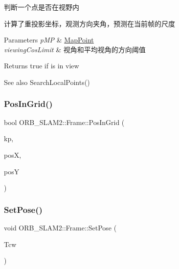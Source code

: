 判断一个点是否在视野内 

计算了重投影坐标，观测方向夹角，预测在当前帧的尺度 
\begin{DoxyParams}{Parameters}
{\em p\+MP} & \mbox{\hyperlink{class_o_r_b___s_l_a_m2_1_1_map_point}{Map\+Point}} \\
\hline
{\em viewing\+Cos\+Limit} & 视角和平均视角的方向阈值 \\
\hline
\end{DoxyParams}
\begin{DoxyReturn}{Returns}
true if is in view 
\end{DoxyReturn}
\begin{DoxySeeAlso}{See also}
Search\+Local\+Points() 
\end{DoxySeeAlso}
\mbox{\label{class_o_r_b___s_l_a_m2_1_1_frame_ae2bc4b1482d2010511da5423d298c9bd}} 
\subsubsection{\texorpdfstring{Pos\+In\+Grid()}{PosInGrid()}}
{\footnotesize\ttfamily bool O\+R\+B\+\_\+\+S\+L\+A\+M2\+::\+Frame\+::\+Pos\+In\+Grid (\begin{DoxyParamCaption}\item[{const cv\+::\+Key\+Point \&}]{kp,  }\item[{int \&}]{posX,  }\item[{int \&}]{posY }\end{DoxyParamCaption})}

\mbox{\label{class_o_r_b___s_l_a_m2_1_1_frame_a95cf2ea68735ef3e8c2d820eada11bf4}} 
\subsubsection{\texorpdfstring{Set\+Pose()}{SetPose()}}
{\footnotesize\ttfamily void O\+R\+B\+\_\+\+S\+L\+A\+M2\+::\+Frame\+::\+Set\+Pose (\begin{DoxyParamCaption}\item[{cv\+::\+Mat}]{Tcw }\end{DoxyParamCaption})}



